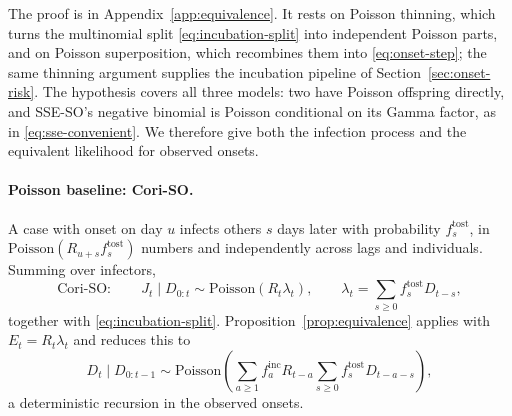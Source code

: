 \documentclass[11pt,a4paper]{article}
\theoremstyle{plain}
\theoremstyle{definition}
\newcommand{\ftost}{f^{\mathrm{tost}}}
\newcommand{\finc}{f^{\mathrm{inc}}}
\newcommand{\Pois}{\mathrm{Poisson}}
\newcommand{\sseso}{SSE-SO}
\newcommand{\coriso}{Cori-SO}
\begin{document}
\noindent
The proof is in Appendix~\ref{app:equivalence}. It rests on Poisson thinning, which turns the
multinomial split \eqref{eq:incubation-split} into independent Poisson parts, and on Poisson
superposition, which recombines them into \eqref{eq:onset-step}; the same thinning argument
supplies the incubation pipeline of Section~\ref{sec:onset-risk}. The hypothesis covers all three
models: two have Poisson offspring directly, and \sseso{}'s negative binomial is Poisson
conditional on its Gamma factor, as in \eqref{eq:sse-convenient}. We therefore give both the
infection process and the equivalent likelihood for observed onsets.

\paragraph{Poisson baseline: \coriso{}.} A case with onset on day $u$
infects others $s$ days later with probability $\ftost_s$, in $\Pois(R_{u+s}\ftost_s)$ numbers
and independently across lags and individuals. Summing over infectors,
\begin{equation}
  \text{\coriso{}}: \qquad
  J_t \mid D_{0:t} \sim \Pois\!\left(R_t\lambda_t\right),
  \qquad
  \lambda_t = \sum_{s\ge0}\ftost_s D_{t-s},
  \label{eq:coriso-natural}
\end{equation}
together with \eqref{eq:incubation-split}. Proposition~\ref{prop:equivalence} applies with
$E_t = R_t\lambda_t$ and reduces this to
\begin{equation}
  D_t \mid D_{0:t-1} \sim
  \Pois\!\left(\sum_{a\ge1}\finc_a R_{t-a}\sum_{s\ge0}\ftost_s D_{t-a-s}\right),
  \label{eq:coriso-convenient}
\end{equation}
a deterministic recursion in the observed onsets.
\end{document}
